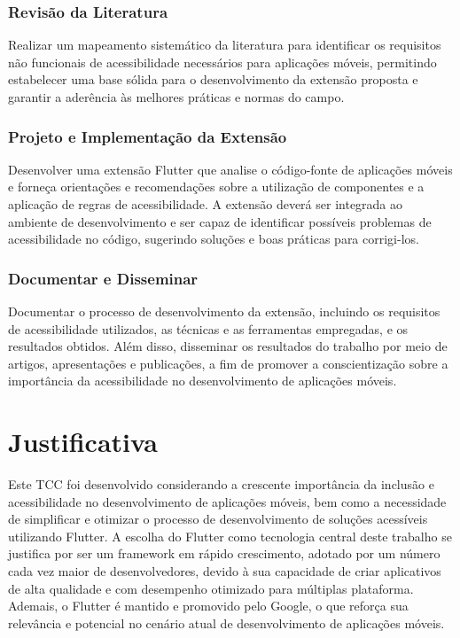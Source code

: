 \subsubsection{Revisão da Literatura}\label{sec:revisao-literatura}

Realizar um mapeamento sistemático da literatura para identificar os requisitos não funcionais de acessibilidade necessários para aplicações móveis, permitindo estabelecer uma base sólida para o desenvolvimento da extensão proposta e garantir a aderência às melhores práticas e normas do campo.

\subsubsection{Projeto e Implementação da Extensão}\label{sec:projeto-implementacao}

Desenvolver uma extensão Flutter que analise o código-fonte de aplicações móveis e forneça orientações e recomendações sobre a utilização de componentes e a aplicação de regras de acessibilidade. A extensão deverá ser integrada ao ambiente de desenvolvimento e ser capaz de identificar possíveis problemas de acessibilidade no código, sugerindo soluções e boas práticas para corrigi-los.

\subsubsection{Documentar e Disseminar}\label{sec:documentar-disseminar}

Documentar o processo de desenvolvimento da extensão, incluindo os requisitos de acessibilidade utilizados, as técnicas e as ferramentas empregadas, e os resultados obtidos. Além disso, disseminar os resultados do trabalho por meio de artigos, apresentações e publicações, a fim de promover a conscientização sobre a importância da acessibilidade no desenvolvimento de aplicações móveis.

\section{Justificativa}

Este TCC foi desenvolvido considerando a crescente importância da inclusão e acessibilidade no desenvolvimento de aplicações móveis, bem como a necessidade de simplificar e otimizar o processo de desenvolvimento de soluções acessíveis utilizando Flutter. A escolha do Flutter como tecnologia central deste trabalho se justifica por ser um framework em rápido crescimento, adotado por um número cada vez maior de desenvolvedores, devido à sua capacidade de criar aplicativos de alta qualidade e com desempenho otimizado para múltiplas plataforma. Ademais, o Flutter é mantido e promovido pelo Google, o que reforça sua relevância e potencial no cenário atual de desenvolvimento de aplicações móveis.

